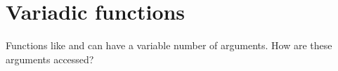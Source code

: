 \section{Variadic functions}

Functions like \printf and \scanf can have a variable number of arguments.
How are these arguments accessed?






